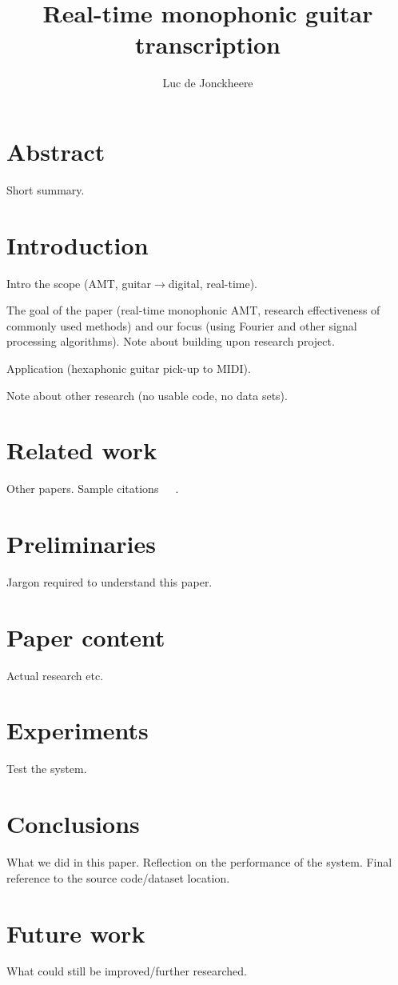 \documentclass[10pt,twocolumn]{article}
\title{\textbf{Real-time monophonic guitar transcription}}
\author{Luc de Jonckheere}
\begin{document}

\maketitle


\section*{Abstract}
Short summary.


\section{Introduction}
Intro the scope (AMT, guitar$\rightarrow$digital, real-time).

The goal of the paper (real-time monophonic AMT, research effectiveness of commonly used methods) and our focus (using Fourier and other signal processing algorithms). Note about building upon research project.

Application (hexaphonic guitar pick-up to MIDI).

Note about other research (no usable code, no data sets).


\section{Related work}
Other papers. Sample citations~\cite{mono}~\cite{window}~\cite{twotimes}.


\section{Preliminaries}
Jargon required to understand this paper.


\section{Paper content}
Actual research etc.


\section{Experiments}  \label{sec:exp}
Test the system.


\section{Conclusions}
What we did in this paper. Reflection on the performance of the system. Final reference to the source code/dataset location.


\section{Future work}  \label{sec:future}
What could still be improved/further researched.





\end{document}
